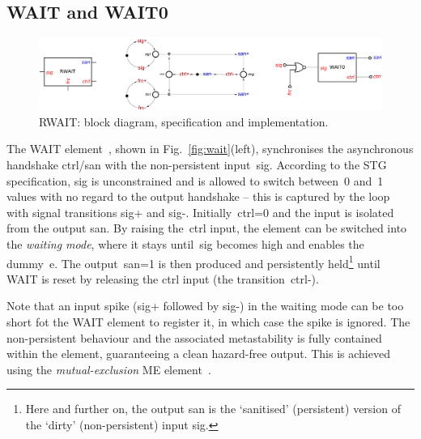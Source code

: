\documentclass[conference]{IEEEtran}
\begin{document}
\subsection*{\textsf{WAIT} and \textsf{WAIT0}}

\begin{figure}
\begin{center}
    \includegraphics[scale=0.23]{fig/RWAIT.pdf}
    \vspace{-2.5mm}
    \caption{\textsf{RWAIT}: block diagram, specification and implementation.}
    \label{fig:rwait}
    \vspace{-8mm}
\end{center}
\end{figure}

The \textsf{WAIT} element~\cite{2015_sokolov_multiphase}, shown in Fig.~\ref{fig:wait}(left),
synchronises the asynchronous handshake \textsf{ctrl/san} with the non-persistent
input~\textsf{sig}. According to the STG specification, \textsf{sig} is unconstrained and
is allowed to switch between~0 and~1 values with no regard to the output handshake -- this
is captured by the loop with signal transitions \textsf{sig+} and \textsf{sig-}.
Initially~\textsf{ctrl=0} and the input is isolated from the output \textsf{san}.
By raising the~\textsf{ctrl} input, the element can be switched into the \emph{waiting mode},
where it stays until~\textsf{sig} becomes high and enables the
dummy~\textsf{e}. The output~\textsf{san=1} is then produced and persistently
held\footnote{Here and further on, the output \textsf{san}
is the `sanitised' (persistent) version of the `dirty' (non-persistent) input \textsf{sig}.}
until \textsf{WAIT} is reset by releasing the \textsf{ctrl} input (the transition~\textsf{ctrl-}).

Note that an input spike (\textsf{sig+} followed by \textsf{sig-}) in the waiting
mode can be too short fot the \textsf{WAIT} element to register it, in which case the spike
is ignored. The non-persistent behaviour and the associated metastability is fully contained
within the element, guaranteeing a clean hazard-free output. This is achieved using the
\emph{mutual-exclusion} \textsf{ME} element~\cite{2008_kinniment_synchronisation}.
\end{document}
